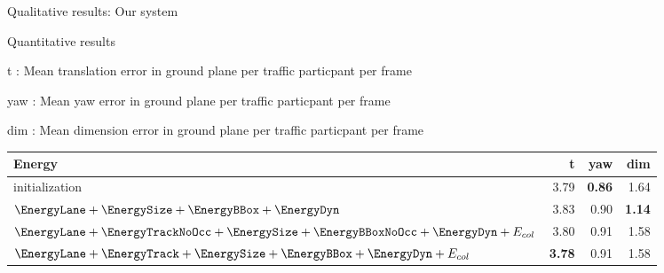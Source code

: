\begin{frame}{Qualitative results: Our system}
  \centering
\end{frame}

\begin{frame}{Quantitative results}
  \small{
    t : Mean translation error in ground plane per traffic particpant per frame

    yaw : Mean yaw error in ground plane per traffic particpant per frame

    dim : Mean dimension error in ground plane per traffic particpant per frame

\begin{table}
  \begin{tabular}{lrrr}
    \toprule
    Energy & t & yaw & dim \\
    \midrule
    initialization                                                                                  & 3.79 & \textbf{0.86} & 1.64 \\
    $\EnergyLane+\EnergySize+\EnergyBBox+\EnergyDyn                                       $ & 3.83 & 0.90 & \textbf{1.14} \\
    $\EnergyLane+\EnergyTrackNoOcc+\EnergySize+\EnergyBBoxNoOcc+\EnergyDyn+\EnergyCol $ & 3.80 & 0.91 & 1.58 \\
    $\EnergyLane+\EnergyTrack+\EnergySize+\EnergyBBox+\EnergyDyn+\EnergyCol   $ & \textbf{3.78} & 0.91 & 1.58 \\
    \bottomrule
  \end{tabular}
\end{table}
  }

\end{frame}

